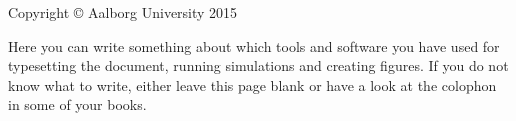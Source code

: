 \thispagestyle{empty}
{
	\small
	\strut\vfill %
	\noindent Copyright \copyright{} Aalborg University 2015\par
	\vspace{0.2cm}
	\noindent Here you can write something about which tools and software you have used for typesetting the document,
	running simulations and creating figures. If you do not know what to write,
	either leave this page blank or have a look at the colophon in some of your books.
}
\clearpage
